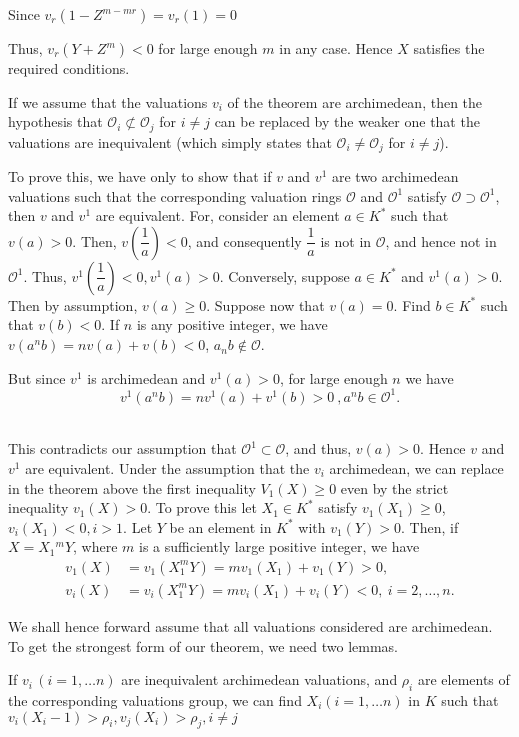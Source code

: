 Since $v_r (1 - Z^{m-mr}) = v_r (1) =0$

Thus, $v_r (Y+Z^m) < 0$ for large enough $m$ in any case. Hence $X$
satisfies the required conditions. 

If we assume that the valuations $v_i$ of the theorem are archimedean,
then the hypothesis that $\mathscr{O}_i \nsubset
\mathscr{O}_j$ for $i \neq j$ can be replaced by the weaker one that
the valuations are inequivalent (which simply states that $\mathscr{O}_i \neq
\mathscr{O}_j$ for $i \neq j$). 

To prove this, we have only to show that if $v$ and $v^1$ are two
archime\-dean valuations such that the corresponding valuation rings
$\mathscr{O}$ and $\mathscr{O}^1$ satisfy $\mathscr{O} \supset
\mathscr{O}^1$, then $v$ and $v^1$ are equivalent. For, consider an
element $a \in K^*$ such that $v(a) > 0$. Then, $v\left(\dfrac{1}{a}\right) < 0$,
and consequently $\dfrac{1}{a}$ is not in $\mathscr{O}$, and hence not
in $\mathscr{O}^1$. Thus, $v^1\left(\dfrac{1}{a}\right) < 0 , v^1 (a) >
0$. Conversely, suppose $a \in K^*$ and $v^1 (a) > 0$. Then by
assumption, $v(a) \geq 0$. Suppose now that $v(a)=0$. Find $b \in K^*$
such that $v(b) < 0$. If $n$ is any positive integer, we have $v(a^nb)
= nv(a) + v(b) < 0$, $a_n b \notin \mathscr{O}$. 

But since $v^1$ is archimedean and $v^1(a) > 0$, for large enough $n$
we have 
$$
v^1 (a^nb) = nv^1(a) + v^1(b) > 0~,a^nb \in \mathscr{O}^1.
$$\pageoriginale\

This contradicts our assumption that $\mathscr{O}^1 \subset
\mathscr{O}$, and thus, $v(a) > 0$. Hence $v$ and $v^1$ are
equivalent. Under the assumption that the $v_i$ archimedean, we can
replace in the theorem above the first inequality $V_1 (X) \geq 0$
even by the strict inequality $v_1 (X) > 0$. To prove this let $X_1
\in K^*$ satisfy $v_1(X_1) \geq 0$, $v_i (X_1) < 0 , i > 1$. Let $Y$
be an element in $K^*$ with $v_1 (Y) > 0$. Then, if $X = X_1 {^mY}$,
where $m$ is a sufficiently large positive integer, we have 
\begin{align*}
  v_1 (X) & = v_1(X_1^mY) = mv_1(X_1) + v_1(Y) > 0,\\
  v_i (X) & = v_i(X_1^mY) = mv_i(X_1) + v_i(Y) < 0,~i=2, \ldots , n.
\end{align*}

We shall hence forward assume that all valuations considered are
archimedean. To get the strongest form of our theorem, we need two
lemmas. 

\setcounter{Lemma}{0}
\begin{Lemma}\label{chap4:sec8:lem1}%
  If $v_i \,(i=1, \ldots n)$ are inequivalent archimedean valuations,
  and $\rho_i$ are elements of the corresponding valuations group, we
  can find $X_i (i=1, \ldots n)$ in $K$ such that $v_i(X_i -1) > \rho
  _i, v_j(X_i) > \rho_j , i \neq j $ 
\end{Lemma}

